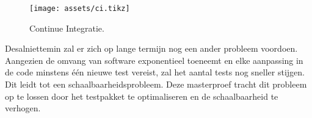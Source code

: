 \begin{figure}[h!]
	\centering
	\texttt{[image: assets/ci.tikz]}
	\caption{Continue Integratie.}
	\label{fig:ext-nl-ci}
\end{figure}

\noindent Desalniettemin zal er zich op lange termijn nog een ander probleem voordoen. Aangezien de omvang van software exponentieel toeneemt en elke aanpassing in de code minstens één nieuwe test vereist, zal het aantal tests nog sneller stijgen. Dit leidt tot een schaalbaarheidsprobleem. Deze masterproef tracht dit probleem op te lossen door het testpakket te optimaliseren en de schaalbaarheid te verhogen.\\